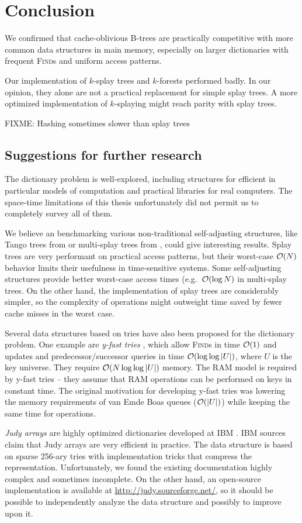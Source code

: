 \chapter*{Conclusion}

We confirmed that cache-oblivious B-trees are practically competitive with
more common data structures in main memory, especially on larger dictionaries
with frequent \textsc{Find}s and uniform access patterns.

Our implementation of $k$-splay trees and $k$-forests performed badly.
In our opinion, they alone are not a practical replacement for simple splay
trees. A more optimized implementation of $k$-splaying might reach parity with
splay trees.

FIXME: Hashing sometimes slower than splay trees

\section*{Suggestions for further research}
The dictionary problem is well-explored, including structures for efficient
in particular models of computation and practical libraries for real computers.
The space-time limitations of this thesis unfortunately did not permit us to
completely survey all of them.

We believe an benchmarking various non-traditional self-adjusting structures,
like Tango trees from \cite{tango} or multi-splay trees from
\cite{multisplay-trees}, could give interesting results. Splay trees are very
performant on practical access patterns, but their worst-case $\mathcal{O}(N)$ behavior
limits their usefulness in time-sensitive systems. Some self-adjusting
structures provide better worst-case access times (e.g.\ $\mathcal{O}(\log N)$ in
multi-splay trees. On the other hand, the implementation of splay trees
are considerably simpler, so the complexity of operations might outweight
time saved by fewer cache misses in the worst case.

Several data structures based on tries have also been proposed for the
dictionary problem. One example are \emph{y-fast tries} \cite{y-fast},
which allow \textsc{Find}s in time $\mathcal{O}(1)$ and updates and predecessor/successor
queries in time $\mathcal{O}(\log\log |U|)$, where $U$ is the key universe. They require
$\mathcal{O}(N \log\log |U|)$ memory.
The RAM model is required by y-fast tries -- they assume that RAM operations
can be performed on keys in constant time.
The original motivation for developing y-fast tries was lowering the memory
requirements of van Emde Boas queues ($\mathcal{O}(|U|)$) while keeping the same time
for operations.

\emph{Judy arrays} are highly optimized dictionaries developed at IBM
\cite{judy-shop-manual, judy-patent}.
IBM sources claim that Judy arrays are very efficient in practice.
The data structure is based on sparse 256-ary tries with implementation tricks
that compress the representation.
Unfortunately, we found the existing documentation highly complex and sometimes
incomplete. On the other hand, an open-source implementation is available
at \url{http://judy.sourceforge.net/}, so it should be possible to independently
analyze the data structure and possibly to improve upon it.
